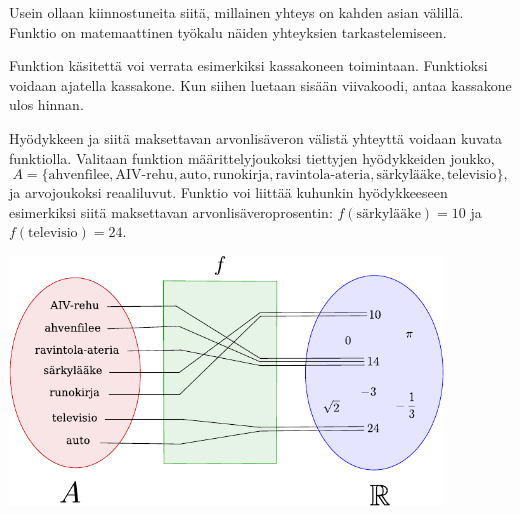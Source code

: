 Usein ollaan kiinnostuneita siitä, millainen yhteys on kahden asian välillä.
Funktio on matemaattinen työkalu näiden yhteyksien tarkastelemiseen.


Funktion käsitettä voi verrata esimerkiksi kassakoneen toimintaan. Funktioksi voidaan ajatella kassakone. Kun siihen luetaan sisään viivakoodi, antaa kassakone ulos hinnan.

\begin{esimerkki}
	Hyödykkeen ja siitä maksettavan arvonlisäveron välistä yhteyttä voidaan kuvata funktiolla.
	Valitaan funktion määrittelyjoukoksi tiettyjen hyödykkeiden joukko,
		\[ A = \{\text{ahvenfilee}, \text{AIV-rehu}, \text{auto}, \text{runokirja},
		\text{ravintola-ateria}, \text{särkylääke}, \text{televisio}\}, \]
	ja arvojoukoksi reaaliluvut.
	Funktio voi liittää kuhunkin hyödykkeeseen esimerkiksi siitä maksettavan arvonlisäveroprosentin:
	$f(\text{särkylääke}) = 10$ ja $f(\text{televisio}) = 24$.

	\begin{center}
		\includegraphics[width=11.5cm]{pictures/funktiokone.pdf}
	\end{center}
\end{esimerkki}


